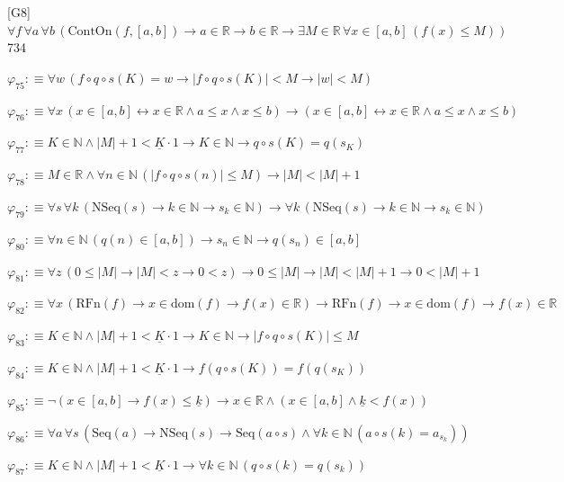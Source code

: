 \begin{fullproof}{[G8]}{$\forall f\,\forall a\,\forall b\,(\mathrm{ContOn}(f,[a,b]) \to a \in \mathbb{R} \to b \in \mathbb{R} \to \exists M \in \mathbb{R}\,\forall x \in [a,b]\,(f(x) \leq M))$}{734}
\begin{abbrevlist}
\item $\varphi_{75} :\equiv \forall w\,(f \circ q \circ s(K) = w \to \lvert f \circ q \circ s(K) \rvert < M \to \lvert w \rvert < M)$
\item $\varphi_{76} :\equiv \forall x\,(x \in [a,b] \leftrightarrow x \in \mathbb{R} \land a \leq x \land x \leq b) \to (x \in [a,b] \leftrightarrow x \in \mathbb{R} \land a \leq x \land x \leq b)$
\item $\varphi_{77} :\equiv K \in \mathbb{N} \land \lvert M \rvert + 1 < \underline{K} \cdot 1 \to K \in \mathbb{N} \to q \circ s(K) = q(s_{K})$
\item $\varphi_{78} :\equiv M \in \mathbb{R} \land \forall n \in \mathbb{N}\,(\lvert f \circ q \circ s(n) \rvert \leq M) \to \lvert M \rvert < \lvert M \rvert + 1$
\item $\varphi_{79} :\equiv \forall s\,\forall k\,(\mathrm{NSeq}(s) \to k \in \mathbb{N} \to s_{k} \in \mathbb{N}) \to \forall k\,(\mathrm{NSeq}(s) \to k \in \mathbb{N} \to s_{k} \in \mathbb{N})$
\item $\varphi_{80} :\equiv \forall n \in \mathbb{N}\,(q(n) \in [a,b]) \to s_{n} \in \mathbb{N} \to q(s_{n}) \in [a,b]$
\item $\varphi_{81} :\equiv \forall z\,(0 \leq \lvert M \rvert \to \lvert M \rvert < z \to 0 < z) \to 0 \leq \lvert M \rvert \to \lvert M \rvert < \lvert M \rvert + 1 \to 0 < \lvert M \rvert + 1$
\item $\varphi_{82} :\equiv \forall x\,(\mathrm{RFn}(f) \to x \in \mathrm{dom}(f) \to f(x) \in \mathbb{R}) \to \mathrm{RFn}(f) \to x \in \mathrm{dom}(f) \to f(x) \in \mathbb{R}$
\item $\varphi_{83} :\equiv K \in \mathbb{N} \land \lvert M \rvert + 1 < \underline{K} \cdot 1 \to K \in \mathbb{N} \to \lvert f \circ q \circ s(K) \rvert \leq M$
\item $\varphi_{84} :\equiv K \in \mathbb{N} \land \lvert M \rvert + 1 < \underline{K} \cdot 1 \to f(q \circ s(K)) = f(q(s_{K}))$
\item $\varphi_{85} :\equiv \neg (x \in [a,b] \to f(x) \leq \underline{k}) \to x \in \mathbb{R} \land (x \in [a,b] \land \underline{k} < f(x))$
\item $\varphi_{86} :\equiv \forall a\,\forall s\,(\mathrm{Seq}(a) \to \mathrm{NSeq}(s) \to \mathrm{Seq}(a \circ s) \land \forall k \in \mathbb{N}\,(a \circ s(k) = a_{s_{k}}))$
\item $\varphi_{87} :\equiv K \in \mathbb{N} \land \lvert M \rvert + 1 < \underline{K} \cdot 1 \to \forall k \in \mathbb{N}\,(q \circ s(k) = q(s_{k}))$

\end{abbrevlist}
\end{fullproof}

